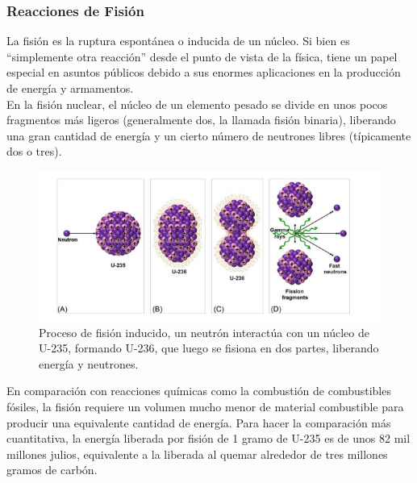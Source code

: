 \subsubsection{Reacciones de Fisión}
La fisión es la ruptura espontánea o inducida de un núcleo. Si bien es “simplemente otra reacción” desde el punto de vista de la física, tiene un papel especial en asuntos públicos debido a sus enormes aplicaciones en la producción de energía y armamentos. \cite{Basdevant.2005}\\

En la fisión nuclear, el núcleo de un elemento pesado se divide en unos pocos
fragmentos más ligeros (generalmente dos, la llamada fisión binaria), liberando una gran cantidad de energía y un cierto número de neutrones libres (típicamente dos o tres). \cite{Murray.2020}
\begin{figure}[H]
    \centering
    \includegraphics[scale=.55]{imagenes/fision nuclear.png}
    \caption{Proceso de fisión inducido, un neutrón interactúa con un núcleo de U-235, formando U-236, que luego se fisiona en dos partes, liberando energía y neutrones.\cite{Murray.2020}}
    \label{fig:fision}
\end{figure}
En comparación con reacciones químicas como la combustión de combustibles fósiles, la fisión requiere un volumen mucho menor de material combustible para producir una equivalente cantidad de energía. Para hacer la comparación más cuantitativa, la energía liberada por fisión de 1 gramo de U-235 es de unos 82 mil millones julios, equivalente a la liberada al quemar alrededor de tres millones gramos de carbón. \cite{Sanctis.2016}

